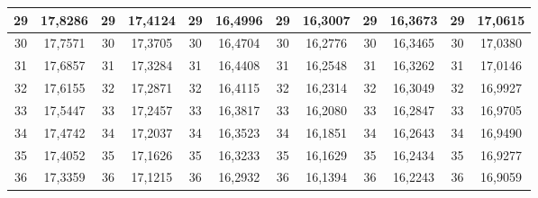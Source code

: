 \documentclass[a4paper,12pt]{article} %
\begin{document}
\begin{longtable}[c]{cccccccccc|c|c|}
	\multicolumn{1}{|c|}{29} & \multicolumn{1}{c|}{17,8286} & \multicolumn{1}{c|}{29} & \multicolumn{1}{c|}{17,4124} & \multicolumn{1}{c|}{29} & \multicolumn{1}{c|}{16,4996} & \multicolumn{1}{c|}{29} & \multicolumn{1}{c|}{16,3007} & \multicolumn{1}{c|}{29} & 16,3673 & 29 & 17,0615 \\ \hline
	\multicolumn{1}{|c|}{30} & \multicolumn{1}{c|}{17,7571} & \multicolumn{1}{c|}{30} & \multicolumn{1}{c|}{17,3705} & \multicolumn{1}{c|}{30} & \multicolumn{1}{c|}{16,4704} & \multicolumn{1}{c|}{30} & \multicolumn{1}{c|}{16,2776} & \multicolumn{1}{c|}{30} & 16,3465 & 30 & 17,0380 \\ \hline
	\multicolumn{1}{|c|}{31} & \multicolumn{1}{c|}{17,6857} & \multicolumn{1}{c|}{31} & \multicolumn{1}{c|}{17,3284} & \multicolumn{1}{c|}{31} & \multicolumn{1}{c|}{16,4408} & \multicolumn{1}{c|}{31} & \multicolumn{1}{c|}{16,2548} & \multicolumn{1}{c|}{31} & 16,3262 & 31 & 17,0146 \\ \hline
	\multicolumn{1}{|c|}{32} & \multicolumn{1}{c|}{17,6155} & \multicolumn{1}{c|}{32} & \multicolumn{1}{c|}{17,2871} & \multicolumn{1}{c|}{32} & \multicolumn{1}{c|}{16,4115} & \multicolumn{1}{c|}{32} & \multicolumn{1}{c|}{16,2314} & \multicolumn{1}{c|}{32} & 16,3049 & 32 & 16,9927 \\ \hline
	\multicolumn{1}{|c|}{33} & \multicolumn{1}{c|}{17,5447} & \multicolumn{1}{c|}{33} & \multicolumn{1}{c|}{17,2457} & \multicolumn{1}{c|}{33} & \multicolumn{1}{c|}{16,3817} & \multicolumn{1}{c|}{33} & \multicolumn{1}{c|}{16,2080} & \multicolumn{1}{c|}{33} & 16,2847 & 33 & 16,9705 \\ \hline
	\multicolumn{1}{|c|}{34} & \multicolumn{1}{c|}{17,4742} & \multicolumn{1}{c|}{34} & \multicolumn{1}{c|}{17,2037} & \multicolumn{1}{c|}{34} & \multicolumn{1}{c|}{16,3523} & \multicolumn{1}{c|}{34} & \multicolumn{1}{c|}{16,1851} & \multicolumn{1}{c|}{34} & 16,2643 & 34 & 16,9490 \\ \hline
	\multicolumn{1}{|c|}{35} & \multicolumn{1}{c|}{17,4052} & \multicolumn{1}{c|}{35} & \multicolumn{1}{c|}{17,1626} & \multicolumn{1}{c|}{35} & \multicolumn{1}{c|}{16,3233} & \multicolumn{1}{c|}{35} & \multicolumn{1}{c|}{16,1629} & \multicolumn{1}{c|}{35} & 16,2434 & 35 & 16,9277 \\ \hline
	\multicolumn{1}{|c|}{36} & \multicolumn{1}{c|}{17,3359} & \multicolumn{1}{c|}{36} & \multicolumn{1}{c|}{17,1215} & \multicolumn{1}{c|}{36} & \multicolumn{1}{c|}{16,2932} & \multicolumn{1}{c|}{36} & \multicolumn{1}{c|}{16,1394} & \multicolumn{1}{c|}{36} & 16,2243 & 36 & 16,9059 \\ \hline

\end{longtable}
\end{document}
